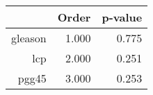 \begin{table}[ht]
\centering
\begin{tabular}{rrr}
  \hline
 & Order & p-value \\ 
  \hline
gleason & 1.000 & 0.775 \\ 
  lcp & 2.000 & 0.251 \\ 
  pgg45 & 3.000 & 0.253 \\ 
   \hline
\end{tabular}
\end{table}
